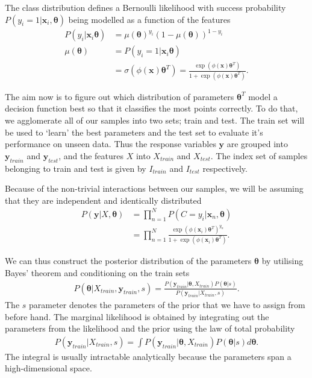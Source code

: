 The class distribution defines a Bernoulli likelihood with success probability $P(y_i = 1| \mathbf{x}_i, \bm{\theta})$ being modelled as a function of the features
\begin{align}
	P(y_i | \mathbf{x}_i  \bm{\theta}) &= \mu( \bm{\theta})^{y_i}(1 - \mu( \bm{\theta}))^{1-y_i}\\
	\mu( \bm{\theta}) &= 	P(y_i =1 | \mathbf{x}_i  \bm{\theta}) \\
	&= \sigma(\phi( \mathbf{x}) \bm{\theta}^T) = \frac{\exp(\phi( \mathbf{x}) \bm{\theta}^T)}{1+\exp(\phi( \mathbf{x}) \bm{\theta}^T)}.
\end{align}
  
  
  The aim now is to figure out which distribution of parameters $ \bm{\theta}^T$ model a decision function best so that it classifies the most points correctly. To do that, we agglomerate all of our samples into two sets; train and test. The train set will be used to `learn' the best parameters and the test set to evaluate it's performance on unseen data. Thus the response variables $\mathbf{y}$ are grouped into $ \mathbf{y}_{train}$ and $ \mathbf{y}_{test} $, and the features $X$ into ${X}_{train}$ and $X_{test}$. The index set of samples belonging to train and test is given by $I_{train}$ and $I_{test}$ respectively.
  
  Because of the non-trivial interactions between our samples, we will be assuming that they are independent and identically distributed
  \begin{align}
   P(\mathbf{y} | X, \bm{\theta}) &=\prod_{n=1}^{N} P\left(C=y_{i} | \mathbf{x}_{n}, \bm{\theta}\right) \\ 
   &=\prod_{n=1}^{N} \frac{\exp \left(\phi\left(\mathbf{x}_{i}\right)\bm{\theta}^{T} \right)^{y_{n}}}{1+\exp \left(\phi\left(\mathbf{x}_{i}\right) \bm{\theta}^{T} \right)} .
   \end{align}
	
	We can thus construct the posterior distribution of the parameters $\bm{\theta}$ by utilising Bayes' theorem and conditioning on the train sets
	\begin{align}
	P\left(\bm{\theta}|X_{train},\mathbf{y}_{train},s\right) = \frac{	P\left(\mathbf{y}_{train}|\bm{\theta},X_{train}\right) P\left(\bm{\theta}|s\right)}{P\left(\mathbf{y}_{train}|X_{train},s\right)}.
	\end{align}
   The $s$ parameter denotes the parameters of the prior that we have to assign from before hand. 
   The marginal likelihood is obtained by integrating out the parameters from the likelihood and the prior using the law of total probability
   \begin{align}
   P\left(\mathbf{y}_{train}|X_{train},s\right) = \int P\left(\mathbf{y}_{train}|\bm{\theta},X_{train}\right) P\left(\bm{\theta}|s\right) d\bm{\theta}.
   \end{align}
   The integral is usually intractable analytically because the parameters span a high-dimensional space.
   
